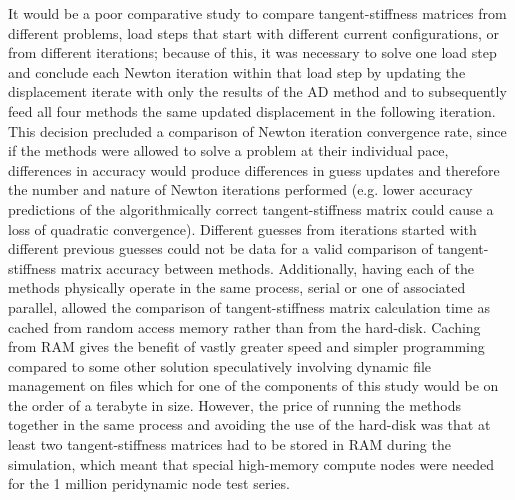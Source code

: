 \documentclass[preprint,12pt]{elsarticle}
\begin{document}
It would be a poor comparative study to compare tangent-stiffness matrices from different problems, load steps that start with different current configurations, or from different iterations; because of this, it was necessary to solve one load step and conclude each Newton iteration within that load step by updating the displacement iterate with only the results of the AD method and to subsequently feed all four methods the same updated displacement in the following iteration. This decision precluded a comparison of Newton iteration convergence rate, since if the methods were allowed to solve a problem at their individual pace, differences in accuracy would produce differences in guess updates and therefore the number and nature of Newton iterations performed (e.g. lower accuracy predictions of the algorithmically correct tangent-stiffness matrix could cause a loss of quadratic convergence).  Different guesses from iterations started with different previous guesses could not be data for a valid comparison of tangent-stiffness matrix accuracy between methods.  Additionally, having each of the methods physically operate in the same process, serial or one of associated parallel, allowed the comparison of tangent-stiffness matrix calculation time as cached from random access memory rather than from the hard-disk.  Caching from RAM gives the benefit of vastly greater speed and simpler programming compared to some other solution speculatively involving dynamic file management on files which for one of the components of this study would be on the order of a terabyte in size. However, the price of running the methods together in the same process and avoiding the use of the hard-disk was that at least two tangent-stiffness matrices had to be stored in RAM during the simulation, which meant that special high-memory compute nodes were needed for the 1 million peridynamic node test series.
\end{document}
